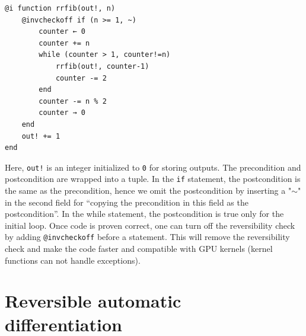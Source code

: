 \documentclass{article}
\newcommand{\<}{\langle}
\renewcommand{\>}{\rangle}
\theoremstyle{definition}\newtheorem{definition}{\textit{Definition}}
\begin{document}
\begin{minipage}{.88\columnwidth}
\begin{lstlisting}[mathescape=true,caption={Computing Fibonacci number recursively and reversibly.},label={lst:fib}]
@i function rrfib(out!, n)
    @invcheckoff if (n >= 1, ~)
        counter ← 0
        counter += n
        while (counter > 1, counter!=n)
            rrfib(out!, counter-1)
            counter -= 2
        end
        counter -= n % 2
        counter → 0
    end
    out! += 1
end
\end{lstlisting}
\end{minipage}

Here, \texttt{out!} is an integer initialized to \texttt{0} for storing outputs.
The precondition and postcondition are wrapped into a tuple. In the \texttt{if} statement, the postcondition is the same as the precondition, hence we omit the postcondition by inserting a "\texttt{$\sim$}" in the second field for ``copying the precondition in this field as the postcondition''.
In the while statement, the postcondition is true only for the initial loop.
Once code is proven correct, one can turn off the reversibility check by adding \texttt{@invcheckoff} before a statement.
This will remove the reversibility check and make the code faster and compatible with GPU kernels (kernel functions can not handle exceptions).

\section{Reversible automatic differentiation}\label{sec:bp}
\end{document}
